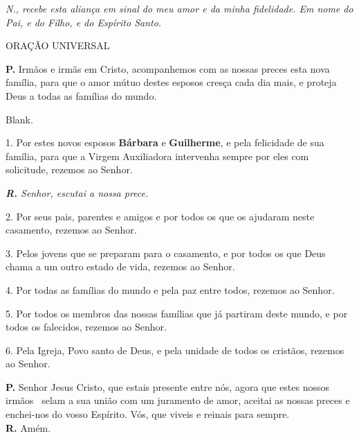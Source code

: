\documentclass[a5paper,9pt]{memoir}
\begin{document}
{\begin{paracol}{2}
\switchcolumn

\itshape
{\itshape \color{mygray}N.}, recebe esta alian\c ca em sinal do meu amor e da minha fidelidade. Em nome do Pai, e do Filho, e do Espírito Santo.
\end{paracol}


\begin{center}
ORAÇÃO UNIVERSAL
\end{center}

\textbf{P.} Irmãos e irmãs em Cristo,
acompanhemos com as nossas preces esta nova fam\'ilia, para que o amor m\'utuo destes esposos cres\c ca cada dia mais, e proteja Deus a todas as fam\'ilias do mundo.\\

\begin{paracol}{2}
{\color{white}Blank.}
	
\switchcolumn

1. Por estes novos esposos {\textbf{B\'arbara} e \textbf{Guilherme}}, e pela felicidade de sua fam\'ilia, {para que a Virgem Auxiliadora intervenha sempre por eles com solicitude,} rezemos ao Senhor.

{\itshape \textbf{R.} Senhor, escutai a nossa prece.}

2. Por seus pais, parentes e amigos e por todos os que os ajudaram neste casamento, rezemos ao Senhor.

3. Pelos jovens que se preparam para o casamento, e por todos os que Deus chama a um outro estado de vida, rezemos ao Senhor.

4. Por todas as fam\'ilias do mundo e pela paz entre todos, rezemos ao Senhor.

5. Por todos os membros das nossas fam\'ilias que j\'a partiram deste mundo, e por todos os falecidos, rezemos ao Senhor.

6. Pela Igreja, Povo santo de Deus, e pela unidade de todos os crist\~aos, rezemos ao Senhor.

\end{paracol}

\textbf{P.} Senhor Jesus Cristo, que estais presente entre n\'os, agora que estes nossos irm\~aos \BG \ selam a sua u\-ni\-\~ao com um juramento de amor, aceitai as nossas preces e enchei-nos do vosso Esp\'irito. V\'os, que viveis e reinais para sempre.\\
\textbf{R.} Amém.


}
\end{document}

